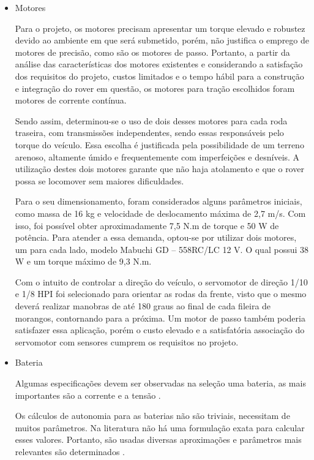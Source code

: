   \begin{itemize}
    \item Motores

    Para o projeto, os motores precisam apresentar um torque elevado e robustez devido ao ambiente em que será submetido,
    porém, não justifica o emprego de motores de precisão, como são os motores de passo. Portanto, a partir da análise das
    características dos motores existentes e considerando a satisfação dos requisitos do projeto, custos limitados e o tempo
    hábil para a construção e integração do rover em questão, os motores para tração escolhidos foram motores de corrente contínua.

    Sendo assim, determinou-se o uso de dois desses motores para cada roda traseira, com transmissões independentes,
    sendo essas responsáveis pelo torque do veículo. Essa escolha é justificada pela possibilidade de um terreno arenoso,
    altamente úmido e frequentemente com imperfeições e desníveis.  A utilização destes dois motores garante que não haja
    atolamento e que o rover possa se locomover sem maiores dificuldades.

    Para o seu dimensionamento, foram considerados alguns parâmetros iniciais, como massa de 16 kg e velocidade de
    deslocamento máxima de 2,7 m/s. Com isso, foi possível obter aproximadamente 7,5 N.m de torque e 50 W de potência.
    Para atender a essa demanda, optou-se por utilizar dois motores, um para cada lado, modelo Mabuchi GD – 558RC/LC 12 V.
    O qual possui 38 W e um torque máximo de 9,3 N.m.

    Com o intuito de controlar a direção do veículo, o servomotor de direção 1/10 e 1/8 HPI foi selecionado para
    orientar as rodas da frente, visto que o mesmo deverá realizar manobras de até 180 graus ao final de cada fileira
    de morangos, contornando para a próxima. Um motor de passo também poderia satisfazer essa aplicação, porém o custo
    elevado e a satisfatória associação do servomotor com sensores cumprem os requisitos no projeto.

    \item Bateria

    Algumas especificações devem ser observadas na seleção uma bateria, as mais importantes são a corrente e a
    tensão \cite{MAGALHAES}.

    Os cálculos de autonomia para as baterias não são triviais, necessitam de muitos parâmetros. Na literatura não
    há uma formulação exata para calcular esses valores. Portanto, são usadas diversas aproximações e parâmetros mais
    relevantes são determinados \cite{MEGGLIAR}.


\end{itemize}
